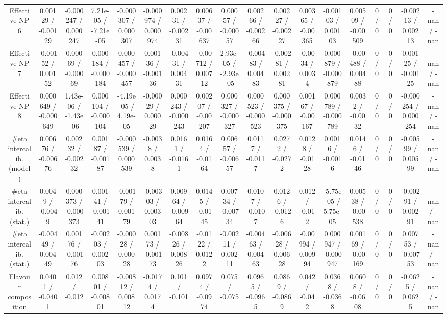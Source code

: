 \documentclass[10pt]{article}
\begin{document}
\begin{table}[htbp]
\begin{center}
\begin{tabular}{|c|c|c|c|c|c|c|c|c|c|c|c|c|c|c|c|c|c|}
  Effective NP 6 & 0.00129 / -0.00129 & -0.000247 / 0.000247 & 7.21e-05 / -7.21e-05 & -0.000307 / 0.000307 & -0.000974 / 0.000974 & 0.00231 / -0.00231 & 0.00637 / -0.00637 & 0.00057 / -0.00057 & 0.00266 / -0.00266 & 0.00227 / -0.00227 & 0.00365 / -0.00365 & -0.00103 / 0.00103 & 0.00509 / -0.00509 & 0 / 0 & 0 / 0 & -0.00213 / 0.00213 & -nan / -nan \\ 
  Effective NP 7 & -0.00152 / 0.00152 & 0.00069 / -0.00069 & 0.000184 / -0.000184 & 0.000457 / -0.000457 & 0.00136 / -0.00136 & -0.00431 / 0.00431 & -0.00712 / 0.00712 & 2.93e-05 / -2.93e-05 & -0.00483 / 0.00483 & -0.00281 / 0.00281 & -0.0034 / 0.0034 & 0.000879 / -0.000879 & -0.00488 / 0.00488 & 0 / 0 & 0 / 0 & 0.00125 / -0.00125 & -nan / -nan \\ 
  Effective NP 8 & 0.000649 / -0.000649 & 1.43e-06 / -1.43e-06 & 0.000104 / -0.000104 & -4.19e-05 / 4.19e-05 & -0.00029 / 0.00029 & 0.000243 / -0.000243 & 0.00207 / -0.00207 & 0.000327 / -0.000327 & 0.000523 / -0.000523 & 0.000375 / -0.000375 & 0.00167 / -0.00167 & 0.000789 / -0.000789 & 0.0032 / -0.0032 & 0 / 0 & 0 / 0 & -0.000254 / 0.000254 & -nan / -nan \\ 
  #eta intercalib. (model) & 0.00676 / -0.00676 & 0.00232 / -0.00232 & 0.00187 / -0.00187 & -0.000539 / 0.000539 & -0.0038 / 0.0038 & 0.0161 / -0.0161 & 0.0164 / -0.0164 & 0.00657 / -0.00657 & 0.0117 / -0.0117 & 0.0272 / -0.0272 & 0.0128 / -0.0128 & 0.0016 / -0.0016 & 0.0146 / -0.0146 & 0 / 0 & 0 / 0 & -0.00599 / 0.00599 & -nan / -nan \\ 
  #eta intercalib. (stat.) & 0.0049 / -0.0049 & 0.000373 / -0.000373 & 0.00141 / -0.00141 & -0.00179 / 0.00179 & -0.00303 / 0.00303 & 0.00964 / -0.00964 & 0.0145 / -0.0145 & 0.00734 / -0.00734 & 0.0107 / -0.0107 & 0.0126 / -0.0126 & 0.012 / -0.012 & -5.75e-05 / 5.75e-05 & 0.00538 / -0.00538 & 0 / 0 & 0 / 0 & -0.00291 / 0.00291 & -nan / -nan \\ 
  #eta intercalib. (stat.) & -0.00449 / 0.00449 & 0.00176 / -0.00176 & -0.00203 / 0.00203 & -0.00028 / 0.00028 & 0.00173 / -0.00173 & -0.00826 / 0.00826 & -0.0122 / 0.0122 & -0.00211 / 0.00211 & -0.00463 / 0.00463 & -0.00628 / 0.00628 & -0.00994 / 0.00994 & 0.000947 / -0.000947 & 0.00169 / -0.00169 & 0 / 0 & 0 / 0 & 0.00753 / -0.00753 & -nan / -nan \\ 
  Flavour composition & 0.0401 / -0.0401 & 0.012 / -0.012 & 0.00801 / -0.00801 & -0.00812 / 0.00812 & -0.0174 / 0.0174 & 0.101 / -0.101 & 0.0974 / -0.0974 & 0.075 / -0.075 & 0.0965 / -0.0965 & 0.0869 / -0.0869 & 0.042 / -0.042 & 0.0368 / -0.0368 & 0.0608 / -0.0608 & 0 / 0 & 0 / 0 & -0.0625 / 0.0625 & -nan / -nan \\ 

\end{tabular}
\end{center}
\end{table}
\end{document}
